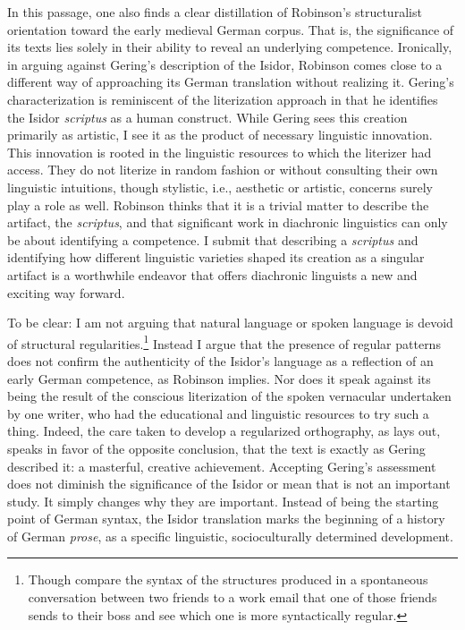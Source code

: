 In this passage, one also finds a clear distillation of Robinson’s structuralist orientation toward the early medieval German corpus. That is, the significance of its texts lies solely in their ability to reveal an underlying competence. Ironically, in arguing against Gering’s description of the Isidor, Robinson comes close to a different way of approaching its German translation without realizing it. Gering’s characterization is reminiscent of the literization approach in that he identifies the Isidor \textit{scriptus} as a human construct. While Gering sees this creation primarily as artistic, I see it as the product of necessary linguistic innovation. This innovation is rooted in the linguistic resources to which the literizer had access. They do not literize in random fashion or without consulting their own linguistic intuitions, though stylistic, i.e., aesthetic or artistic, concerns surely play a role as well. Robinson thinks that it is a trivial matter to describe the artifact, the \textit{scriptus}, and that significant work in diachronic linguistics can only be about identifying a competence. I submit that describing a \textit{scriptus} and identifying how different linguistic varieties shaped its creation as a singular artifact is a worthwhile endeavor that offers diachronic linguists a new and exciting way forward.

To be clear: I am not arguing that natural language or spoken language is devoid of structural regularities.\footnote{{Though compare the syntax of the structures produced in a spontaneous conversation between two friends to a work email that one of those friends sends to their boss and see which one is more syntactically regular.} } Instead I argue that the presence of regular patterns does not confirm the authenticity of the Isidor’s language as a reflection of an early German competence, as Robinson implies. Nor does it speak against its being the result of the conscious literization of the spoken vernacular undertaken by one writer, who had the educational and linguistic resources to try such a thing. Indeed, the care taken to develop a regularized orthography, as \citet{Matzel1970} lays out, speaks in favor of the opposite conclusion, that the text is exactly as Gering described it: a masterful, creative achievement. Accepting Gering’s assessment does not diminish the significance of the Isidor or mean that \citet{Robinson1997} is not an important study. It simply changes why they are important. Instead of being the starting point of German syntax, the Isidor translation marks the beginning of a history of German \textit{prose}, as a specific linguistic, socioculturally determined development.

